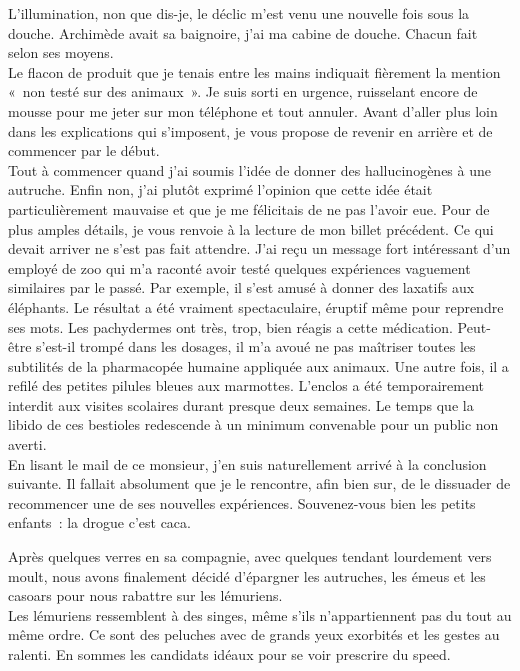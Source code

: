 ﻿L’illumination, non que dis-je, le déclic m’est venu une nouvelle fois sous la douche. Archimède avait sa baignoire, j’ai ma cabine de douche. Chacun fait selon ses moyens.\\
Le flacon de produit que je tenais entre les mains indiquait fièrement la mention « non testé sur des animaux ». Je suis sorti en urgence, ruisselant encore de mousse pour me jeter sur mon téléphone et tout annuler. Avant d’aller plus loin dans les explications qui s’imposent, je vous propose de revenir en arrière et de commencer par le début. \\
Tout à commencer quand j’ai soumis l’idée de donner des hallucinogènes à une autruche. Enfin non, j’ai plutôt exprimé l’opinion que cette idée était particulièrement mauvaise et que je me félicitais de ne pas l’avoir eue. Pour de plus amples détails, je vous renvoie à la lecture de mon billet précédent. Ce qui devait arriver ne s’est pas fait attendre. J’ai reçu un message fort intéressant d’un employé de zoo qui m’a raconté avoir testé quelques expériences vaguement similaires par le passé. Par exemple, il s’est amusé à donner des laxatifs aux éléphants. Le résultat a été vraiment spectaculaire, éruptif même pour reprendre ses mots. Les pachydermes ont très, trop, bien réagis a cette médication. Peut-être s’est-il trompé dans les dosages, il m’a avoué ne pas maîtriser toutes les subtilités de la pharmacopée humaine appliquée aux animaux. Une autre fois, il a refilé des petites pilules bleues aux marmottes. L’enclos a été temporairement interdit aux visites scolaires durant presque deux semaines. Le temps que la libido de ces bestioles redescende à un minimum convenable pour un public non averti. \\
En lisant le mail de ce monsieur, j’en suis naturellement arrivé à la conclusion suivante. Il fallait absolument que je le rencontre, afin bien sur, de le dissuader de recommencer une de ses nouvelles expériences. Souvenez-vous bien les petits enfants : la drogue c’est caca. 

Après quelques verres en sa compagnie, avec quelques tendant lourdement vers moult, nous avons finalement décidé d’épargner les autruches, les émeus et les casoars pour nous rabattre sur les lémuriens.\\
Les lémuriens ressemblent à des singes, même s’ils n’appartiennent pas du tout au même ordre. Ce sont des peluches avec de grands yeux exorbités et les gestes au ralenti. En sommes les candidats idéaux pour se voir prescrire du speed.

